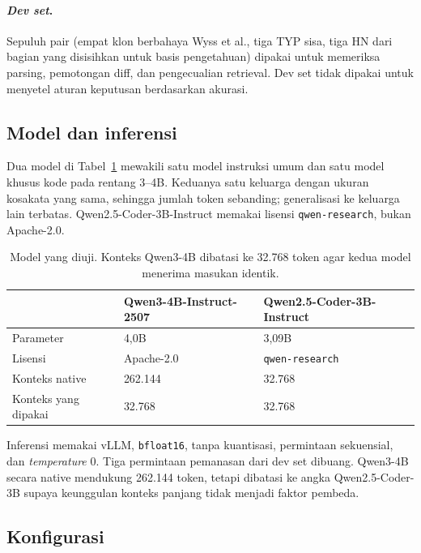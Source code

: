 \documentclass[a4paper,fleqn]{cas-dc}
\begin{document}
\paragraph{\emph{Dev set}.}
Sepuluh pair (empat klon berbahaya Wyss et al., tiga TYP sisa, tiga HN dari
bagian yang disisihkan untuk basis pengetahuan) dipakai untuk memeriksa
parsing, pemotongan diff, dan pengecualian retrieval. Dev set tidak dipakai
untuk menyetel aturan keputusan berdasarkan akurasi.

\subsection{Model dan inferensi}\label{sec:models}

Dua model di Tabel~\ref{tab:models} mewakili satu model instruksi umum dan
satu model khusus kode pada rentang 3--4B. Keduanya
satu keluarga dengan ukuran kosakata yang sama, sehingga jumlah token
sebanding; generalisasi ke keluarga lain terbatas. Qwen2.5-Coder-3B-Instruct
memakai lisensi \texttt{qwen-research}, bukan Apache-2.0.

\begin{table}[t]
\caption{Model yang diuji. Konteks Qwen3-4B dibatasi ke 32.768 token agar
kedua model menerima masukan identik.}
\label{tab:models}
\small
\begin{tabular}{p{2.4cm} p{2.6cm} p{2.6cm}}
\hline
  & Qwen3-4B-Instruct-2507 & Qwen2.5-Coder-3B-Instruct \\
\hline
Parameter & 4,0B & 3,09B \\
Lisensi & Apache-2.0 & \texttt{qwen-research} \\
Konteks native & 262.144 & 32.768 \\
Konteks yang dipakai & 32.768 & 32.768 \\
\hline
\end{tabular}
\end{table}

Inferensi memakai vLLM, \texttt{bfloat16}, tanpa kuantisasi, permintaan
sekuensial, dan \emph{temperature} 0. Tiga permintaan pemanasan dari dev set
dibuang. Qwen3-4B secara native mendukung 262.144 token, tetapi dibatasi ke
angka Qwen2.5-Coder-3B supaya keunggulan konteks panjang tidak menjadi faktor
pembeda.

\subsection{Konfigurasi}\label{sec:configs}
\end{document}
